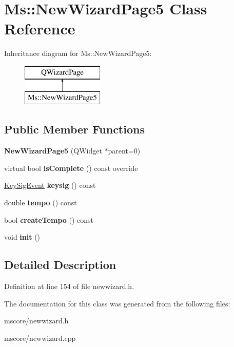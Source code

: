 \hypertarget{class_ms_1_1_new_wizard_page5}{}\section{Ms\+:\+:New\+Wizard\+Page5 Class Reference}
\label{class_ms_1_1_new_wizard_page5}
Inheritance diagram for Ms\+:\+:New\+Wizard\+Page5\+:\begin{figure}[H]
\begin{center}
\leavevmode
\includegraphics[height=2.000000cm]{class_ms_1_1_new_wizard_page5}
\end{center}
\end{figure}
\subsection*{Public Member Functions}
\begin{DoxyCompactItemize}
\item 
\mbox{\label{class_ms_1_1_new_wizard_page5_aab0dacefb3c9a01726f47771aa0a8a5f}} 
{\bfseries New\+Wizard\+Page5} (Q\+Widget $\ast$parent=0)
\item 
\mbox{\label{class_ms_1_1_new_wizard_page5_a0e4e4caf5c3c3c3bd692549e5afdc63e}} 
virtual bool {\bfseries is\+Complete} () const override
\item 
\mbox{\label{class_ms_1_1_new_wizard_page5_aedb1da74d198e3dd465f276ecbefc4d9}} 
\hyperlink{class_ms_1_1_key_sig_event}{Key\+Sig\+Event} {\bfseries keysig} () const
\item 
\mbox{\label{class_ms_1_1_new_wizard_page5_a7ba84cb48dbe18c619e270c1afd12e23}} 
double {\bfseries tempo} () const
\item 
\mbox{\label{class_ms_1_1_new_wizard_page5_a76f158b519a4acb623173203eaa518bf}} 
bool {\bfseries create\+Tempo} () const
\item 
\mbox{\label{class_ms_1_1_new_wizard_page5_a53e1bc3c76baeabc32053f68b150084c}} 
void {\bfseries init} ()
\end{DoxyCompactItemize}


\subsection{Detailed Description}


Definition at line 154 of file newwizard.\+h.



The documentation for this class was generated from the following files\+:\begin{DoxyCompactItemize}
\item 
mscore/newwizard.\+h\item 
mscore/newwizard.\+cpp\end{DoxyCompactItemize}
